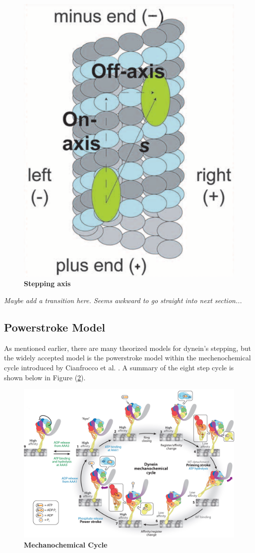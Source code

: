 \begin{figure}[H]
	\centering
	\includegraphics[width=0.3\columnwidth]{Figures/Onaxis.png}
	\caption[Stepping Axis]{\textbf{Stepping axis}  \cite{Dewitt2012} }
	\label{fig:axis}
\end{figure}

\textit{Maybe add a transition here. Seems awkward to go straight into next section...}



\subsection{Powerstroke Model}

As mentioned earlier, there are many theorized models for dynein's stepping, but the widely accepted model is the powerstroke model within the mechenochemical cycle introduced by Cianfrocco et al. \cite{Cianfrocco2015mechanism}. A summary of the eight step cycle is shown below in Figure (\ref{fig:MechanochemicalCycle}).

\begin{figure}[H]
	\centering
	\includegraphics[width=1\columnwidth]{Figures/mechanochemical_cycle.jpeg}
	\caption[Mechanochemical Cycle]{\textbf{Mechanochemical Cycle}  \cite{Cianfrocco2015mechanism}}
	\label{fig:MechanochemicalCycle}
\end{figure}

